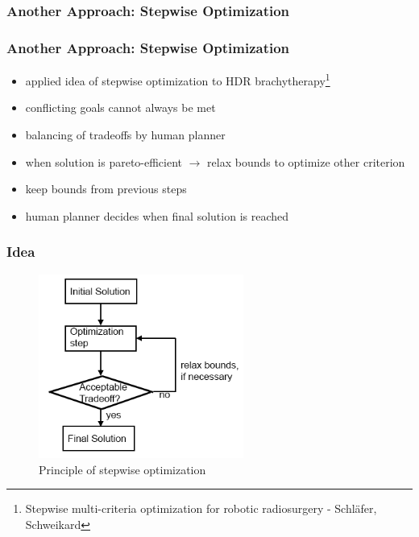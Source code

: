 \documentclass{beamer}
\begin{document}
\subsubsection*{Another Approach: Stepwise Optimization}
	\begin{frame}
	\frametitle{Another Approach: Stepwise Optimization}
	\begin{itemize}
	\item applied idea of stepwise optimization to HDR brachytherapy\footnote{Stepwise multi-criteria optimization for robotic radiosurgery - Schläfer, Schweikard} 
	\item conflicting goals cannot always be met
	\item balancing of tradeoffs by human planner
	\item when solution is pareto-efficient $\rightarrow$ relax bounds to optimize other criterion
	\item keep bounds from previous steps
	\item human planner decides when final solution is reached
	\end{itemize}   
	\end{frame}
	
	\begin{frame}
	\frametitle{Idea}
		\begin{figure}[h]
		\centering
		\includegraphics[width=0.6\textwidth]{pictures/struktogramm_resized}
		\caption{Principle of stepwise optimization}
		\end{figure}
	\end{frame}
	
\end{document}
